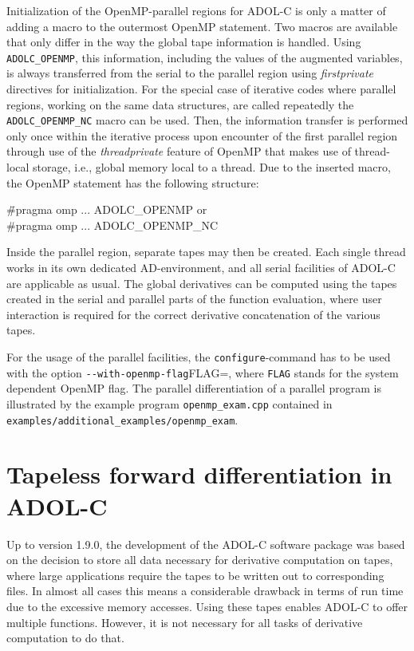 \documentclass[11pt,twoside]{article}
\begin{document}
Initialization of the OpenMP-parallel regions for \mbox{ADOL-C} is only a matter of adding a macro to the outermost OpenMP statement.
Two macros are available that only differ in the way the global tape information is handled.
Using {\tt ADOLC\_OPENMP}, this information, including the values of the augmented variables, is always transferred from the serial to the parallel region using {\it firstprivate} directives for initialization.
For the special case of iterative codes where parallel regions, working on the same data structures, are called repeatedly the {\tt ADOLC\_OPENMP\_NC} macro can be used.
Then, the information transfer is performed only once within the iterative process upon encounter of the first parallel region through use of the {\it threadprivate} feature of OpenMP that makes use of thread-local storage, i.e., global memory local to a thread.
Due to the inserted macro, the OpenMP statement has the following structure:
\begin{tabbing}
\hspace*{1cm} \= {\sf \#pragma omp ... ADOLC\_OPENMP} \qquad \qquad or \\
              \> {\sf \#pragma omp ... ADOLC\_OPENMP\_NC}
\end{tabbing}
Inside the parallel region, separate tapes may then be created.
Each single thread works in its own dedicated AD-environment, and all
serial facilities of \mbox{ADOL-C} are applicable as usual. The global
derivatives can be computed using the tapes created in the serial and
parallel parts of the function evaluation, where user interaction is
required for the correct derivative concatenation of the various tapes.

For the usage of the parallel facilities, the \verb=configure=-command
has to be used with the option \verb=--with-openmp-flag=FLAG=, where 
\verb=FLAG= stands for the system dependent OpenMP flag.
The parallel differentiation of a parallel program is illustrated
by the example program \verb=openmp_exam.cpp= contained in \verb=examples/additional_examples/openmp_exam=.
%
%
\section{Tapeless forward differentiation in ADOL-C}
\label{tapeless}
%
Up to version 1.9.0, the development of the ADOL-C software package
was based on the decision to store all data necessary for derivative
computation on tapes, where large applications require the tapes to be
written out to corresponding files. In almost all cases this means
a considerable drawback in terms of run time due to the excessive
memory accesses. Using these tapes enables ADOL-C to offer multiple
functions. However, it is not necessary for all tasks of derivative
computation to do that. 
\end{document}
